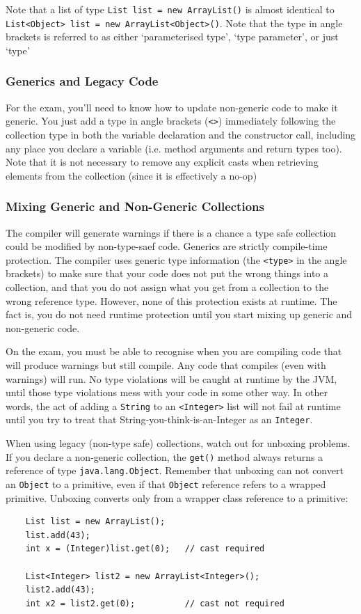 Note that a list of type \verb#List list = new ArrayList()# is almost identical 
to \verb#List<Object> list = new ArrayList<Object>()#. Note that the type in 
angle brackets is referred to as either `parameterised type', `type parameter', 
or just `type'

\subsubsection{Generics and Legacy Code}
For the exam, you'll need to know how to update non-generic code to make it 
generic. You just add a type in angle brackets (\verb#<>#) immediately 
following the collection type in both the variable declaration and the 
constructor call, including any place you declare a variable (i.e. method 
arguments and return types too). Note that it is not necessary to remove any 
explicit casts when retrieving elements from the collection (since it is 
effectively a no-op) 

\subsubsection{Mixing Generic and Non-Generic Collections}
The compiler will generate warnings if there is a chance a type safe collection 
could be modified by non-type-saef code. Generics are strictly compile-time 
protection. The compiler uses generic type information (the \verb#<type># in 
the angle brackets) to make sure that your code does not put the wrong things 
into a collection, and that you do not assign what you get from a collection to 
the wrong reference type. However, none of this protection exists at runtime.  
The fact is, you do not need runtime protection until you start mixing up 
generic and non-generic code.

On the exam, you must be able to recognise when you are compiling code that 
will produce warnings but still compile. Any code that compiles (even with 
warnings) will run. No type violations will be caught at runtime by the JVM, 
until those type violations mess with your code in some other way. In other 
words, the act of adding a \verb#String# to an \verb#<Integer># list will not 
fail at runtime until you try to treat that String-you-think-is-an-Integer as 
an \verb#Integer#.

When using legacy (non-type safe) collections, watch out for unboxing problems.  
If you declare a non-generic collection, the \verb#get()# method always returns 
a reference of type \verb#java.lang.Object#. Remember that unboxing can not 
convert an \verb#Object# to a primitive, even if that \verb#Object# reference 
refers to a wrapped primitive. Unboxing converts only from a wrapper class 
reference to a primitive:
\begin{verbatim}
    List list = new ArrayList();
    list.add(43);
    int x = (Integer)list.get(0);   // cast required

    List<Integer> list2 = new ArrayList<Integer>();
    list2.add(43);
    int x2 = list2.get(0);          // cast not required
\end{verbatim}

